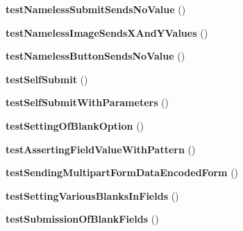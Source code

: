 \begin{DoxyCompactItemize}
\item 
\hypertarget{class_live_test_of_forms_acadbabe03a2dddba5b8867c5cc2ff70d}{
{\bfseries testNamelessSubmitSendsNoValue} ()}
\label{class_live_test_of_forms_acadbabe03a2dddba5b8867c5cc2ff70d}

\item 
\hypertarget{class_live_test_of_forms_a8b95353bf556542a08c4ef6290f5281b}{
{\bfseries testNamelessImageSendsXAndYValues} ()}
\label{class_live_test_of_forms_a8b95353bf556542a08c4ef6290f5281b}

\item 
\hypertarget{class_live_test_of_forms_a447a89ad0dd092fc72cd70e3ace25004}{
{\bfseries testNamelessButtonSendsNoValue} ()}
\label{class_live_test_of_forms_a447a89ad0dd092fc72cd70e3ace25004}

\item 
\hypertarget{class_live_test_of_forms_af30ab4a69a9e98bf0b664be38c08b116}{
{\bfseries testSelfSubmit} ()}
\label{class_live_test_of_forms_af30ab4a69a9e98bf0b664be38c08b116}

\item 
\hypertarget{class_live_test_of_forms_a3acd100cd6d77f0c3cf00afa2b811df9}{
{\bfseries testSelfSubmitWithParameters} ()}
\label{class_live_test_of_forms_a3acd100cd6d77f0c3cf00afa2b811df9}

\item 
\hypertarget{class_live_test_of_forms_a3f1d1bf6ce873cf3061f2fd337f33f11}{
{\bfseries testSettingOfBlankOption} ()}
\label{class_live_test_of_forms_a3f1d1bf6ce873cf3061f2fd337f33f11}

\item 
\hypertarget{class_live_test_of_forms_a0178dc47641c7160d384558c9a9f0006}{
{\bfseries testAssertingFieldValueWithPattern} ()}
\label{class_live_test_of_forms_a0178dc47641c7160d384558c9a9f0006}

\item 
\hypertarget{class_live_test_of_forms_a34e3709f5d8d225bbd1c23091986e35e}{
{\bfseries testSendingMultipartFormDataEncodedForm} ()}
\label{class_live_test_of_forms_a34e3709f5d8d225bbd1c23091986e35e}

\item 
\hypertarget{class_live_test_of_forms_aca1632812278d0b2d2ac4fc7c8c564e5}{
{\bfseries testSettingVariousBlanksInFields} ()}
\label{class_live_test_of_forms_aca1632812278d0b2d2ac4fc7c8c564e5}

\item 
\hypertarget{class_live_test_of_forms_a302cb785175ed74b4b133a4edab4528a}{
{\bfseries testSubmissionOfBlankFields} ()}
\label{class_live_test_of_forms_a302cb785175ed74b4b133a4edab4528a}


\end{DoxyCompactItemize}

